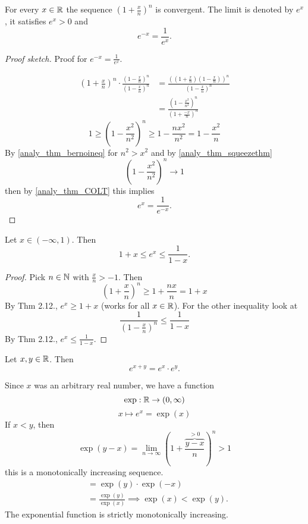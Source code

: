 \documentclass[10pt, a4paper]{article}
\begin{document}
\begin{theorem}
    For every $x \in \mathbb{R}$ the sequence $\left(1 + \frac{x}{n}\right) ^ n$ is convergent.
    The limit is denoted by $e ^ x$,
    it satisfies $e ^ x  > 0$ and
    \[
    e ^ {-x} = \frac{1}{e ^ x}.
    \]
    \begin{proof}[Proof sketch]\renewcommand{\qedsymbol}{$\triangle$}
        Proof for $e ^ {-x} = \frac{1}{e ^ x}$.

        \begin{align*}
            \left(1 + \frac{x}{n}\right) ^ n \cdot \frac{\left(1 - \frac{x}{n}\right) ^ n}{\left(1 - \frac{x}{n}\right) ^ n} &= \frac{\left(\left(1 + \frac{x}{n}\right)\left(1 - \frac{x}{n}\right)\right) ^ n}{\left(1 - \frac{x}{n}\right) ^ n} \\
            &= \frac{\left(1 - \frac{x ^ 2}{n ^ 2}\right) ^ n}{\left(1 + \frac{-x}{n}\right) ^ n}
        \end{align*}
        \[
        1 \geq \left(1 - \frac{x ^ 2}{n ^ 2}\right) ^ n \geq 1 - \frac{nx ^ 2}{n ^ 2} = 1 - \frac{x ^ 2}{n}
        \]
        By \autoref{analy_thm_bernoineq} for $n ^ 2 > x ^ 2$
        and by \autoref{analy_thm_squeezethm}
        \[
        \left(1 - \frac{x ^ 2}{n ^ 2}\right) ^ n \rightarrow 1
        \]
        then by \autoref{analy_thm_COLT} this implies
        \[
        e ^ x = \frac{1}{e ^ {-x}}.
        \]
    \end{proof}
\end{theorem}

\begin{lemma}
    Let $x \in (-\infty, 1)$.
    Then
    \[
    1 + x \leq e ^ x \leq \frac{1}{1 - x}.
    \]
    \begin{proof}
        Pick $n \in \mathbb{N}$ with $\frac{x}{n} > -1$.
        Then
        \[
        \left(1 + \frac{x}{n}\right) ^ n \geq 1 + \frac{nx}{n} = 1 + x
        \]
        By Thm 2.12.,
        $e ^ x \geq 1 + x$
        (works for all $x \in \mathbb{R}$).
        For the other inequality look at
        \[
        \frac{1}{\left(1 - \frac{x}{n}\right) ^ n} \leq \frac{1}{1 - x}
        \]
        By Thm 2.12.,
        $e ^ x \leq \frac{1}{1 - x}$.
    \end{proof}
\end{lemma}

\begin{theorem}
    Let $x, y \in \mathbb{R}$.
    Then
    \[
    e ^ {x + y} = e ^ x \cdot e ^ y.
    \]
\end{theorem}

Since $x$ was an arbitrary real number,
we have a function
\[
\exp : \mathbb{R} \rightarrow (0, \infty)
\]
\[
x \mapsto e ^ x = \exp(x)
\]
If $x < y$,
then
\[
\exp(y - x) = \lim_{n \rightarrow \infty}\left(1 + \frac{\overbrace{y - x}^{>0}}{n}\right) ^ n > 1
\]
this is a monotonically increasing sequence.
\begin{align*}
    &= \exp(y)\cdot\exp(-x) \\
    &= \frac{\exp(y)}{\exp(x)} \implies \exp(x) < \exp(y).
\end{align*}
The exponential function is strictly monotonically increasing.
\end{document}
